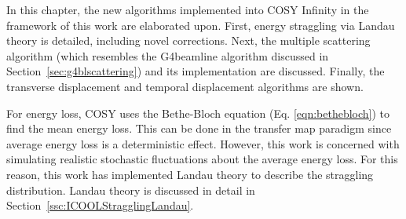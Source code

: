 In this chapter, the new algorithms implemented into COSY Infinity in the framework of this work are elaborated upon. First, energy straggling via Landau theory is detailed, including novel corrections. Next, the multiple scattering algorithm (which resembles the G4beamline algorithm discussed in Section~\ref{sec:g4blscattering}) and its implementation are discussed. Finally, the transverse displacement and temporal displacement algorithms are shown.

 \label{sec:COSYStraggling}\par
For energy loss, COSY uses the Bethe-Bloch equation (Eq. \eqref{eqn:bethebloch}) to find the mean energy loss. This can be done in the transfer map paradigm since average energy loss is a deterministic effect. However, this work is concerned with simulating realistic stochastic fluctuations about the average energy loss. For this reason, this work has implemented Landau theory \cite{landau} to describe the straggling distribution. Landau theory is discussed in detail in Section~\ref{ssc:ICOOLStragglingLandau}. 

